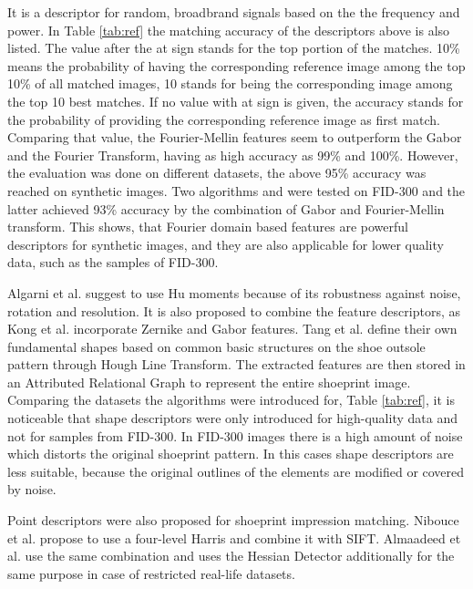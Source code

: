 \documentclass[draft,final]{vutinfth} %
\begin{document}
It is a descriptor for random, broadbrand signals based on the the frequency and power.
In Table \ref{tab:ref} the matching accuracy of the descriptors above is also listed.
The value after the at sign stands for the top portion of the matches.
10\% means the probability of having the corresponding reference image among the top 10\% of all matched images, 10 stands for being the corresponding image among the top 10 best matches.
If no value with at sign is given, the accuracy stands for the probability of providing the corresponding reference image as first match.
Comparing that value, the Fourier-Mellin features seem to outperform the Gabor and the Fourier Transform, having as high accuracy as 99\% and 100\%.
However, the  evaluation was done on different datasets, the above 95\% accuracy was reached on synthetic images.
Two algorithms \cite{kortylewski2014unsupervised} and \cite{wu2019crime} were tested on FID-300 and the latter achieved 93\% accuracy by the combination of Gabor and Fourier-Mellin transform.
This shows, that Fourier domain based features are powerful descriptors for synthetic images, and they are also applicable for lower quality data, such as the samples of FID-300.
\par
Algarni et al. \cite{algarni2008novel} suggest to use Hu moments because of its robustness against noise, rotation and resolution.
It is also proposed to combine the feature descriptors, as Kong et al. \cite{kong2014novel} incorporate Zernike and Gabor features.
Tang et al. \cite{tang2010footwear} define their own fundamental shapes based on common basic structures on the shoe outsole pattern through Hough Line Transform. 
The extracted features are then stored in an Attributed Relational Graph to represent the entire shoeprint image.
Comparing the datasets the algorithms were introduced for, Table \ref{tab:ref}, it is noticeable that shape descriptors were only introduced for high-quality data and not for samples from FID-300.
In FID-300 images there is a high amount of noise which distorts the original shoeprint pattern.
In this cases shape descriptors are less suitable, because the original outlines of the elements are modified or covered by noise.
\par
Point descriptors were also proposed for shoeprint impression matching.
Nibouce et al. \cite{nibouche2009rotation} propose to use a four-level Harris and combine it with SIFT.
Almaadeed et al. \cite{almaadeed2015partial} use the same combination and uses the Hessian Detector additionally for the same purpose in case of restricted real-life datasets.
\end{document}
